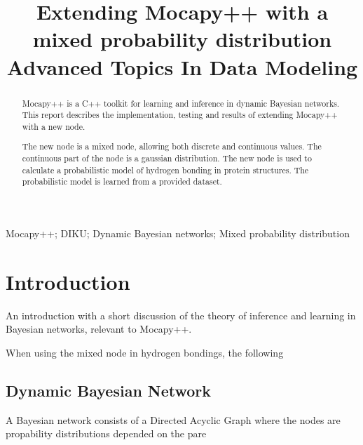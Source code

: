 \documentclass[10pt, conference, compsocconf,a4paper]{IEEEtran}
\begin{document}
\title{Extending Mocapy++ with a mixed probability distribution\\Advanced Topics In Data Modeling}

\author{
}

\maketitle



\begin{abstract}
Mocapy++ is a C++ toolkit for learning and inference in dynamic Bayesian networks. This report describes the implementation, testing and results of extending Mocapy++ with a new node. 

The new node is a mixed node, allowing both discrete and continuous values. The continuous part of the node is a gaussian distribution. The new node is used to calculate a probabilistic model of hydrogen bonding in protein structures. The probabilistic model is learned from a provided dataset.
\end{abstract}

\begin{IEEEkeywords}
Mocapy++; DIKU; Dynamic Bayesian networks; Mixed probability distribution
\end{IEEEkeywords}


\section{Introduction} %
\label{sec:introduction}



% 
% 

An introduction with a short discussion of the theory of inference and learning in Bayesian networks, relevant to Mocapy++.

When using the mixed node in hydrogen bondings, the following 


\subsection{Dynamic Bayesian Network} %
\label{sub:dynamic_bayesian_network}
A Bayesian network consists of a Directed Acyclic Graph where the nodes are propability distributions depended on the pare
\end{document}
